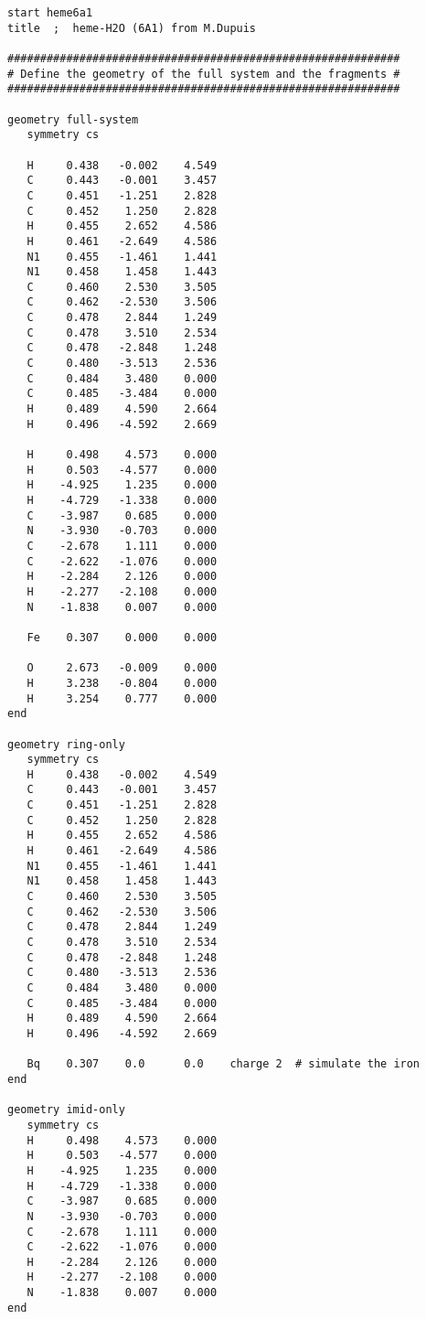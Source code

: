 \begin{verbatim}
start heme6a1
title  ;  heme-H2O (6A1) from M.Dupuis

############################################################
# Define the geometry of the full system and the fragments #
############################################################

geometry full-system
   symmetry cs

   H     0.438   -0.002    4.549
   C     0.443   -0.001    3.457
   C     0.451   -1.251    2.828
   C     0.452    1.250    2.828
   H     0.455    2.652    4.586
   H     0.461   -2.649    4.586
   N1    0.455   -1.461    1.441
   N1    0.458    1.458    1.443
   C     0.460    2.530    3.505
   C     0.462   -2.530    3.506
   C     0.478    2.844    1.249
   C     0.478    3.510    2.534
   C     0.478   -2.848    1.248
   C     0.480   -3.513    2.536
   C     0.484    3.480    0.000
   C     0.485   -3.484    0.000
   H     0.489    4.590    2.664
   H     0.496   -4.592    2.669

   H     0.498    4.573    0.000
   H     0.503   -4.577    0.000
   H    -4.925    1.235    0.000
   H    -4.729   -1.338    0.000
   C    -3.987    0.685    0.000
   N    -3.930   -0.703    0.000
   C    -2.678    1.111    0.000
   C    -2.622   -1.076    0.000
   H    -2.284    2.126    0.000
   H    -2.277   -2.108    0.000
   N    -1.838    0.007    0.000

   Fe    0.307    0.000    0.000

   O     2.673   -0.009    0.000
   H     3.238   -0.804    0.000
   H     3.254    0.777    0.000
end

geometry ring-only
   symmetry cs
   H     0.438   -0.002    4.549
   C     0.443   -0.001    3.457
   C     0.451   -1.251    2.828
   C     0.452    1.250    2.828
   H     0.455    2.652    4.586
   H     0.461   -2.649    4.586
   N1    0.455   -1.461    1.441
   N1    0.458    1.458    1.443
   C     0.460    2.530    3.505
   C     0.462   -2.530    3.506
   C     0.478    2.844    1.249
   C     0.478    3.510    2.534
   C     0.478   -2.848    1.248
   C     0.480   -3.513    2.536
   C     0.484    3.480    0.000
   C     0.485   -3.484    0.000
   H     0.489    4.590    2.664
   H     0.496   -4.592    2.669

   Bq    0.307    0.0      0.0    charge 2  # simulate the iron
end

geometry imid-only
   symmetry cs
   H     0.498    4.573    0.000
   H     0.503   -4.577    0.000
   H    -4.925    1.235    0.000
   H    -4.729   -1.338    0.000
   C    -3.987    0.685    0.000
   N    -3.930   -0.703    0.000
   C    -2.678    1.111    0.000
   C    -2.622   -1.076    0.000
   H    -2.284    2.126    0.000
   H    -2.277   -2.108    0.000
   N    -1.838    0.007    0.000
end


\end{verbatim}
